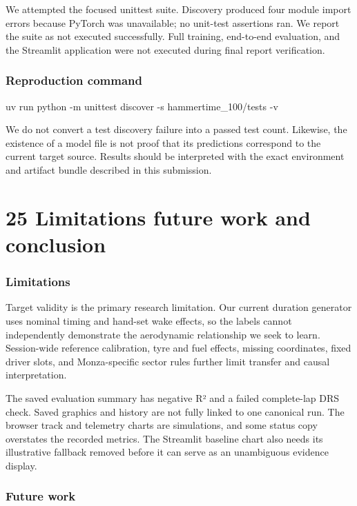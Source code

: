 \documentclass[11pt,a4paper,oneside]{report}
\begin{document}
We attempted the focused unittest suite. Discovery produced four module import errors because PyTorch was unavailable; no unit-test assertions ran. We report the suite as not executed successfully. Full training, end-to-end evaluation, and the Streamlit application were not executed during final report verification.

\subsection*{Reproduction command}

uv run python -m unittest discover -s hammertime\_100/tests -v

We do not convert a test discovery failure into a passed test count. Likewise, the existence of a model file is not proof that its predictions correspond to the current target source. Results should be interpreted with the exact environment and artifact bundle described in this submission.

\clearpage

\clearpage\chapter*{25 Limitations future work and conclusion}

\subsection*{Limitations}

Target validity is the primary research limitation. Our current duration generator uses nominal timing and hand-set wake effects, so the labels cannot independently demonstrate the aerodynamic relationship we seek to learn. Session-wide reference calibration, tyre and fuel effects, missing coordinates, fixed driver slots, and Monza-specific sector rules further limit transfer and causal interpretation.

The saved evaluation summary has negative R² and a failed complete-lap DRS check. Saved graphics and history are not fully linked to one canonical run. The browser track and telemetry charts are simulations, and some status copy overstates the recorded metrics. The Streamlit baseline chart also needs its illustrative fallback removed before it can serve as an unambiguous evidence display.

\subsection*{Future work}
\end{document}
